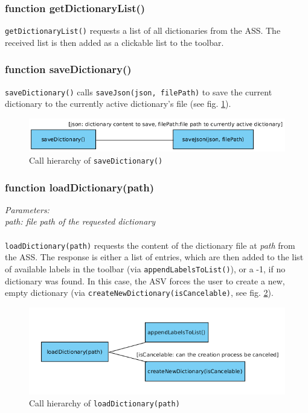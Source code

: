 \subsubsection{function getDictionaryList()}
\texttt{getDictionaryList()} requests a list of all dictionaries from the ASS. The received list is then added as a clickable list to the toolbar.


\subsubsection{function saveDictionary()}
\texttt{saveDictionary()} calls \texttt{saveJson(json, filePath)} to save the current dictionary to the currently active dictionary's file (see fig. \ref{figB_saveDict}).

\begin{figure}[H]
	\begin{center}
		\includegraphics[scale=0.5]{img/ch_saveDict.png}
		\caption{Call hierarchy of \texttt{saveDictionary()}}
		\label{figB_saveDict}
	\end{center}
\end{figure}


\subsubsection{function loadDictionary(path)}
\emph{Parameters:\\
	path: file path of the requested dictionary\\ \\
}
\texttt{loadDictionary(path)} requests the content of the dictionary file at \emph{path} from the ASS. The response is either a list of entries, which are then added to the list of available labels in the toolbar (via \texttt{appendLabelsToList()}), or a -1, if no dictionary was found. In this case, the ASV forces the user to create a new, empty dictionary (via \texttt{createNewDictionary(isCancelable)}, see fig. \ref{figB_loadDict}).

\begin{figure}[H]
	\begin{center}
		\includegraphics[scale=0.5]{img/ch_loadDict.png}
		\caption{Call hierarchy of \texttt{loadDictionary(path)}}
		\label{figB_loadDict}
	\end{center}
\end{figure}


